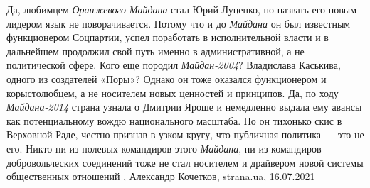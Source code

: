 Да, любимцем \emph{Оранжевого Майдана} стал Юрий Луценко, но назвать его новым
лидером язык не поворачивается. Потому что и до \emph{Майдана} он был известным
функционером Соцпартии, успел поработать в исполнительной власти и в дальнейшем
продолжил свой путь именно в административной, а не политической сфере.  Кого
еще породил \emph{Майдан-2004}? Владислава Каськива, одного из создателей
«Поры»?  Однако он тоже оказался функционером и корыстолюбцем, а не носителем
новых ценностей и принципов.  Да, по ходу \emph{Майдана-2014} страна узнала о
Дмитрии Яроше и немедленно выдала ему авансы как потенциальному вождю
национального масштаба. Но он тихонько скис в Верховной Раде, честно признав в
узком кругу, что публичная политика — это не его. Никто ни из полевых
командиров этого \emph{Майдана}, ни из командиров добровольческих соединений
тоже не стал носителем и драйвером новой системы общественных отношений
, 
Александр Кочетков, strana.ua, 16.07.2021

